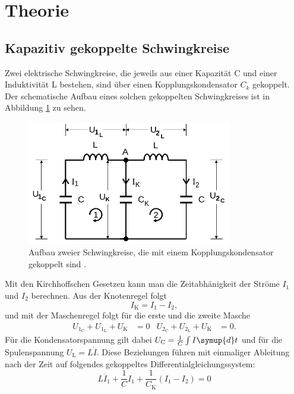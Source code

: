 \section{Theorie}
\label{sec:Theorie}
\subsection{Kapazitiv gekoppelte Schwingkreise}
Zwei elektrische Schwingkreise, die jeweils aus einer Kapazität C und einer
Induktivität L bestehen, sind über einen Kopplungskondensator $C_k$ gekoppelt.
Der schematische Aufbau eines solchen gekoppelten Schwingkreises ist in Abbildung
\ref{fig:schwingkreis} zu sehen.
\begin{figure}
  \centering
  \includegraphics[width=0.8\textwidth]{schwingkreis.png}
  \caption{Aufbau zweier Schwingkreise, die mit einem Kopplungskondensator
  gekoppelt sind \cite{sample}.}
  \label{fig:schwingkreis}
\end{figure}
Mit den Kirchhoffschen Gesetzen kann man die Zeitabhänigkeit der Ströme $I_1$
und $I_2$ berechnen.
Aus der Knotenregel folgt
\begin{equation}
  I_\text{K} = I_1 - I_2 ,
  \label{eqn:knoten}
\end{equation}
und mit der Maschenregel folgt für die erste und die zweite Masche
\begin{align}
  U_{1_\text{C}} + U_{1_\text{L}} + U_\text{K} &= 0
  & U_{2_\text{C}} + U_{2_\text{L}} + U_\text{K} &= 0 .
  \label{eqn:maschen}
\end{align}
Für die Kondensatorspannung gilt dabei $U_\text{C} = \frac{1}{C}\int I \symup{d}t$
und für die Spulenspannung $U_\text{L} = L \dot{I}$.
Diese Beziehungen führen mit einmaliger Ableitung nach der Zeit auf folgendes
gekoppeltes Differentialgleichungssystem:
\begin{equation}
  L \ddot{I_1} + \frac{1}{C} I_1 + \frac{1}{C_\text{K}} (I_1 - I_2) = 0
  \label{eqn:gekoppelte_dgl_1}
\end{equation}
